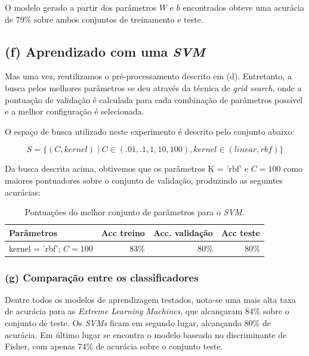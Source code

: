 \documentclass[12pt]{report}
\begin{document}
O modelo gerado a partir dos parâmetros $W$ e $b$ encontrados obteve uma acurácia de 79\% sobre ambos conjuntos de treinamento e teste.

\subsection{(f) Aprendizado com uma \textit{SVM}}

Mas uma vez, reutilizamos o pré-processamento descrito em (d). Entretanto, a busca pelos melhores parâmetros se deu através da técnica de \textit{grid search}, onde a pontuação de validação é calculada para cada combinação de parâmetros possível e a melhor configuração é selecionada.

O espaço de busca utilizado neste experimento é descrito pelo conjunto abaixo:

$$S = \{(C, kernel) \mid C \in (.01, .1, 1, 10, 100), kernel \in (linear, rbf)\}$$

Da busca descrita acima, obtivemos que os parâmetros K = 'rbf' e $C = 100$ como maiores pontuadores sobre o conjunto de validação, produzindo as seguintes acurácias:

\begin{table}[H]
	\centering
	\begin{tabular}{l|r|r|r}
		\textbf{Parâmetros} & \textbf{Acc treino} & \textbf{Acc. validação} & \textbf{Acc teste} \\\hline
		kernel = 'rbf'; $C = 100$ & 83\% & 80\% & 80\%  \\
	\end{tabular}
	\caption{Pontuações do melhor conjunto de parâmetros para o \textit{SVM}.}
	\label{tbl:lrn_svm_scores}
\end{table}

\subsubsection{(g) Comparação entre os classificadores}

Dentre todos os modelos de aprendizagem testados, nota-se uma mais alta taxa de acurácia para as \textit{Extreme Learning Machines}, que alcançaram 84\% sobre o conjunto de teste. Os \textit{SVMs} ficam em segundo lugar, alcançando 80\% de acurácia. Em último lugar se encontra o modelo baseado no discriminante de Fisher, com apenas 74\% de acurácia sobre o conjunto teste.
\end{document}
